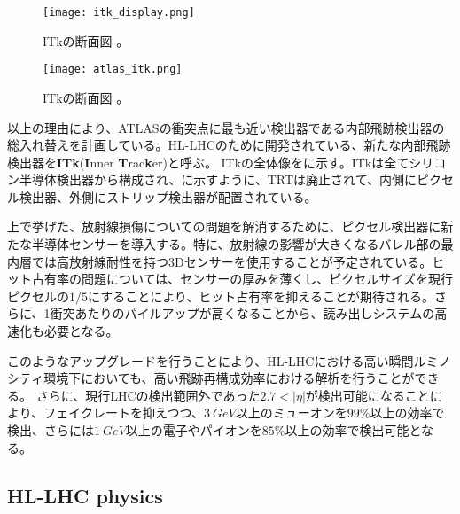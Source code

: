 \begin{figure}[tbp]
  \centering
  \texttt{[image: itk\_display.png]}
  \caption[ITkの断面図]{ITkの断面図 \cite{itk}。}
  \label{fig:hl-lhc-itk}
\end{figure}

\begin{figure}[tbp]
  \centering
  \texttt{[image: atlas\_itk.png]}
  \caption[ITkの断面図]{ITkの断面図 \cite{itk}。}
  \label{fig:itk-danmen}
\end{figure}

以上の理由により、ATLASの衝突点に最も近い検出器である内部飛跡検出器の総入れ替えを計画している。HL-LHCのために開発されている、新たな内部飛跡検出器を\textbf{ITk}(\textbf{I}nner \textbf{T}rac\textbf{k}er)と呼ぶ。
ITkの全体像をに示す。ITkは全てシリコン半導体検出器から構成され、に示すように、TRTは廃止されて、内側にピクセル検出器、外側にストリップ検出器が配置されている。

上で挙げた、放射線損傷についての問題を解消するために、ピクセル検出器に新たな半導体センサーを導入する。特に、放射線の影響が大きくなるバレル部の最内層では高放射線耐性を持つ3Dセンサーを使用することが予定されている。ヒット占有率の問題については、センサーの厚みを薄くし、ピクセルサイズを現行ピクセルの$1/5$にすることにより、ヒット占有率を抑えることが期待される。さらに、1衝突あたりのパイルアップが高くなることから、読み出しシステムの高速化も必要となる。


このようなアップグレードを行うことにより、HL-LHCにおける高い瞬間ルミノシティ環境下においても、高い飛跡再構成効率における解析を行うことができる。
さらに、現行LHCの検出範囲外であった$2.7<|\eta|$が検出可能になることにより、フェイクレートを抑えつつ、$3\ \si{GeV}$以上のミューオンを$99\si{\%}$以上の効率で検出、さらには$1\ \si{GeV}$以上の電子やパイオンを$85\si{\%}$以上の効率で検出可能となる。



\subsection{HL-LHC physics}
\label{sec:hl-lhc-physics}





\newpage
